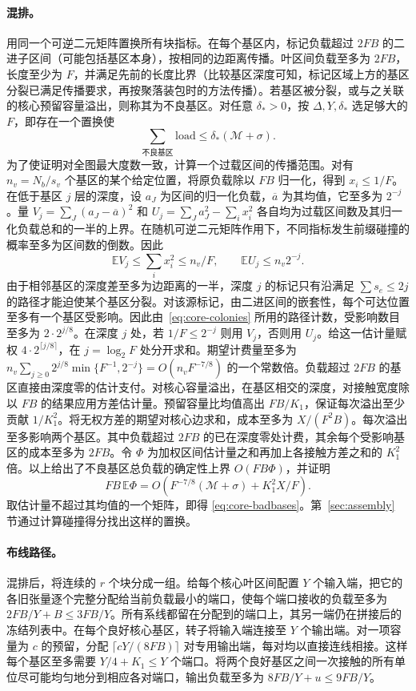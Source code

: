 \paragraph{混排。} 用同一个可逆二元矩阵置换所有块指标。在每个基区内，标记负载超过 \(2FB\) 的二进子区间（可能包括基区本身），按相同的边距离传播。叶区间负载至多为 \(2FB\)，长度至少为 \(F\)，并满足先前的长度比界（比较基区深度可知，标记区域上方的基区分裂已满足传播要求，再按聚落装包时的方法传播）。若基区被分裂，或与之关联的核心预留容量溢出，则称其为不良基区。对任意 \(\delta_*>0\)，按 \(\Delta,Y,\delta_*\) 选足够大的 \(F\)，即存在一个置换使 \begin{equation}
 \sum_{\text{不良基区}}\mathrm{load}\le\delta_*(\mathcal M+\sigma).
 \label{eq:core-badbases}
\end{equation} 为了使证明对全图最大度数一致，计算一个过载区间的传播范围。对有 \(n_v=N_b/s_v\) 个基区的某个给定位置，将原负载除以 \(FB\) 归一化，得到 \(x_i\le1/F\)。在低于基区 \(j\) 层的深度，设 \(a_J\) 为区间的归一化负载，\(\overline a\) 为其均值，它至多为 \(2^{-j}\)。量 \(V_j=\sum_J(a_J-\overline a)^2\) 和 \(U_j=\sum_J a_J^2-\sum_i x_i^2\) 各自均为过载区间数及其归一化负载总和的一半的上界。在随机可逆二元矩阵作用下，不同指标发生前缀碰撞的概率至多为区间数的倒数。因此 \[
 \mathbb E V_j\le\sum_i x_i^2\le n_v/F,\qquad
 \mathbb E U_j\le n_v2^{-j}.
\] 由于相邻基区的深度差至多为边距离的一半，深度 \(j\) 的标记只有沿满足 \(\sum s_e\le 2j\) 的路径才能迫使某个基区分裂。对该源标记，由二进区间的嵌套性，每个可达位置至多有一个基区受影响。因此由~\eqref{eq:core-colonies} 所用的路径计数，受影响数目至多为 \(2\cdot 2^{j/8}\)。在深度 \(j\) 处，若 \(1/F\le2^{-j}\) 则用 \(V_j\)，否则用 \(U_j\)。给这一估计量赋权 \(4\cdot 2^{\lceil j/8\rceil}\)，在 \(j=\log_2 F\) 处分开求和。期望计费量至多为 \(n_v\sum_{j\ge0}2^{j/8}\min\{F^{-1},2^{-j}\}=O(n_vF^{-7/8})\) 的一个常数倍。负载超过 \(2FB\) 的基区直接由深度零的估计支付。对核心容量溢出，在基区相交的深度，对接触宽度除以 \(FB\) 的结果应用方差估计量。预留容量比均值高出 \(FB/K_1\)，保证每次溢出至少贡献 \(1/K_1^2\)。将无权方差的期望对核心边求和，成本至多为 \(X/(F^2B)\)。每次溢出至多影响两个基区。其中负载超过 \(2FB\) 的已在深度零处计费，其余每个受影响基区的成本至多为 \(2FB\)。令 \(\Phi\) 为加权区间估计量之和再加上各接触方差之和的 \(K_1^2\) 倍。以上给出了不良基区总负载的确定性上界 $O(FB\Phi)$，并证明 \[
 FB\,\mathbb E\Phi = O(F^{-7/8}(\mathcal M+\sigma)+ K_1^2X/F).
\] 取估计量不超过其均值的一个矩阵，即得 \eqref{eq:core-badbases}。第~\ref{sec:assembly} 节通过计算碰撞得分找出这样的置换。

\paragraph{布线路径。} 混排后，将连续的 \(r\) 个块分成一组。给每个核心叶区间配置 \(Y\) 个输入端，把它的各旧张量逐个完整分配给当前负载最小的端口，使每个端口接收的负载至多为 \(2FB/Y+B\le 3FB/Y\)。所有系线都留在分配到的端口上，其另一端仍在拼接后的冻结列表中。在每个良好核心基区，转子将输入端连接至 \(Y\) 个输出端。对一项容量为 \(c\) 的预留，分配 \(\lceil cY/(8FB)\rceil\) 对专用输出端，每对均以直接连线相接。这样每个基区至多需要 \(Y/4+K_1\le Y\) 个端口。将两个良好基区之间一次接触的所有单位尽可能均匀地分到相应各对端口，输出负载至多为 \(8FB/Y+u\le9FB/Y\)。

